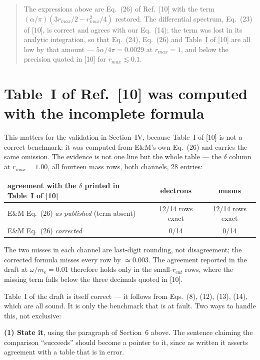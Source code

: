 \documentclass[11pt]{article}
\begin{document}
\begin{quote}
The expressions above are Eq.~(26) of Ref.~[10] with the term
$(\alpha/\pi)(3r_{max}/2-r_{max}^{2}/4)$ restored. The differential spectrum,
Eq.~(23) of [10], is correct and agrees with our Eq.~(14); the term was lost in
its analytic integration, so that Eq.~(24), Eq.~(26) and Table~I of [10] are all
low by that amount --- $5\alpha/4\pi=0.0029$ at $r_{max}=1$, and below the
precision quoted in [10] for $r_{max}\lesssim0.1$.
\end{quote}

\section{Table~I of Ref.~[10] was computed with the incomplete formula}

This matters for the validation in Section~IV, because Table~I of [10] is not a
correct benchmark: it was computed from E\&M's own Eq.~(26) and carries the same
omission. The evidence is not one line but the whole table --- the $\delta$
column at $r_{max}=1.00$, all fourteen mass rows, both channels, 28 entries:

\begin{center}
\begin{tabular}{lcc}
\toprule
agreement with the $\delta$ printed in Table~I of [10] & electrons & muons\\
\midrule
E\&M Eq.~(26) \emph{as published} (term absent) & 12/14 rows exact & 12/14 rows exact\\
E\&M Eq.~(26) \emph{corrected}                  & 0/14             & 0/14\\
\bottomrule
\end{tabular}
\end{center}

The two misses in each channel are last-digit rounding, not disagreement; the
corrected formula misses every row by $\simeq0.003$. The agreement reported in
the draft at $\omega/m_e=0.01$ therefore holds only in the small-$r_{cut}$ rows,
where the missing term falls below the three decimals quoted in [10].

Table~I of the draft is itself correct --- it follows from Eqs.~(8), (12), (13),
(14), which are all sound. It is only the benchmark that is at fault. Two ways to
handle this, not exclusive:

\textbf{(1) State it}, using the paragraph of Section~6 above. The sentence
claiming the comparison ``succeeds'' should become a pointer to it, since as
written it asserts agreement with a table that is in error.
\end{document}
